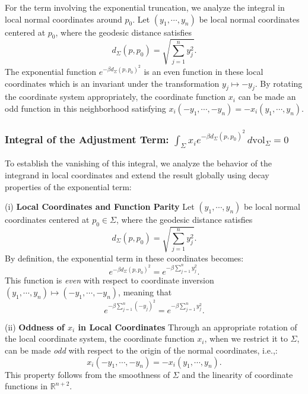 \documentclass[a4, 12pt]{amsart}
\numberwithin{equation}{section} \numberwithin{equation}{section}
\begin{document}
For the term involving the exponential truncation, we analyze the integral in local normal coordinates around $p_0$. Let $(y_1, \cdots, y_n)$ be local normal coordinates centered at $p_0$, where the geodesic distance satisfies
\begin{equation*}
d_{\Sigma}(p, p_0) = \sqrt{\sum_{j=1}^n y_j^2}.
\end{equation*}
The exponential function $e^{-\beta d_{\Sigma}(p, p_0)^2}$ is an even function in these local coordinates which is an invariant under the transformation $y_j \mapsto -y_j$. By rotating the coordinate system appropriately, the coordinate function $x_i$ can be made an odd function in this neighborhood satisfying $x_i(-y_1, \cdots, -y_n) = -x_i(y_1, \cdots, y_n)$.

\subsubsection{Integral of the Adjustment Term: $\int_{\Sigma} x_i e^{-\beta d_{\Sigma}(p, p_0)^2} \, d\mathrm{vol}_{\Sigma} = 0$}

To establish the vanishing of this integral, we analyze the behavior of the integrand in local coordinates and extend the result globally using decay properties of the exponential term:

(i) \textbf{Local Coordinates and Function Parity}
Let $(y_1, \cdots, y_n)$ be local normal coordinates centered at $p_0 \in \Sigma$, where the geodesic distance satisfies
\begin{equation}\label{eq:local-distance}
d_{\Sigma}(p, p_0) = \sqrt{\sum_{j=1}^n y_j^2}.
\end{equation}
By definition, the exponential term in these coordinates becomes:
\begin{equation}\label{eq:exponential-even}
e^{-\beta d_{\Sigma}(p, p_0)^2} = e^{-\beta \sum_{j=1}^n y_j^2}.
\end{equation}
This function is \textit{even} with respect to coordinate inversion $(y_1, \cdots, y_n) \mapsto (-y_1, \cdots, -y_n)$, meaning that
\begin{equation*}
e^{-\beta \sum_{j=1}^n (-y_j)^2} = e^{-\beta \sum_{j=1}^n y_j^2}.
\end{equation*}

(ii) \textbf{Oddness of $x_i$ in Local Coordinates}
Through an appropriate rotation of the local coordinate system, the coordinate function $x_i$, when we restrict it to $\Sigma$, can be made \textit{odd} with respect to the origin of the normal coordinates, i.e.,:
\begin{equation}\label{eq:xi-odd}
x_i(-y_1, \cdots, -y_n) = -x_i(y_1, \cdots, y_n).
\end{equation}
This property follows from the smoothness of $\Sigma$ and the linearity of coordinate functions in $\mathbb{R}^{n+2}$.
\end{document}
